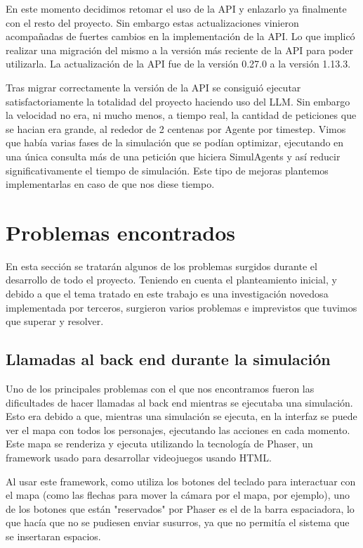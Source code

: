 En este momento decidimos retomar el uso de la API y enlazarlo ya finalmente con el resto del proyecto. Sin embargo estas actualizaciones vinieron acompañadas de fuertes cambios en la implementación de la API. Lo que implicó realizar una migración del mismo a la versión más reciente de la API para poder utilizarla. La actualización de la API fue de la versión 0.27.0 a la versión 1.13.3. 

Tras migrar correctamente la versión de la API se consiguió ejecutar satisfactoriamente la totalidad del proyecto haciendo uso del LLM. Sin embargo la velocidad no era, ni mucho menos, a tiempo real, la cantidad de peticiones que se hacian era grande, al rededor de 2 centenas por Agente por timestep. Vimos que había varias fases de la simulación que se podían optimizar, ejecutando en una única consulta más de una petición que hiciera SimulAgents y así reducir significativamente el tiempo de simulación. Este tipo de mejoras plantemos implementarlas en caso de que nos diese tiempo.

\section{Problemas encontrados}

En esta sección se tratarán algunos de los problemas surgidos durante el desarrollo de todo el proyecto. Teniendo en cuenta el planteamiento inicial, y debido a que el tema tratado en este trabajo es una investigación novedosa implementada por terceros, surgieron varios problemas e imprevistos que tuvimos que superar y resolver.

\subsection{Llamadas al back end durante la simulación}

Uno de los principales problemas con el que nos encontramos fueron las dificultades de hacer llamadas al back end mientras se ejecutaba una simulación. Esto era debido a que, mientras una simulación se ejecuta, en la interfaz se puede ver el mapa con todos los personajes, ejecutando las acciones en cada momento. Este mapa se renderiza y ejecuta utilizando la tecnología de Phaser, un framework usado para desarrollar videojuegos usando HTML.

Al usar este framework, como utiliza los botones del teclado para interactuar con el mapa (como las flechas para mover la cámara por el mapa, por ejemplo), uno de los botones que están "reservados" por Phaser es el de la barra espaciadora, lo que hacía que no se pudiesen enviar susurros, ya que no permitía el sistema que se insertaran espacios.

